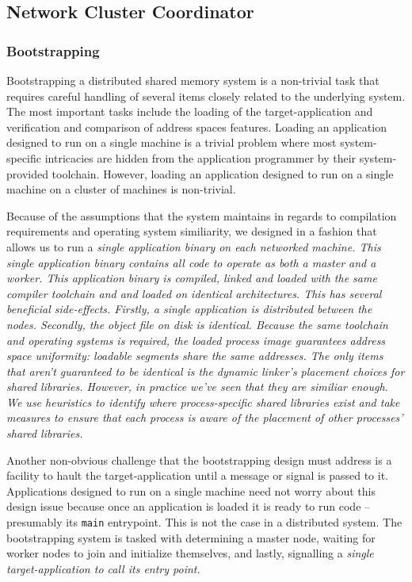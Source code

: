 \subsection{Network Cluster Coordinator}

\subsubsection{Bootstrapping}
Bootstrapping a distributed shared memory system is a non-trivial task that requires careful handling of several items closely related to the underlying system.  The most important tasks include the loading of the target-application and verification and comparison of address spaces features.  Loading an application designed to run on a single machine is a trivial problem where most system-specific intricacies are hidden from the application programmer by their system-provided toolchain.  However, loading an application designed to run on a single machine on a cluster of machines is non-trivial.

Because of the assumptions that the \projname{} system maintains in regards to compilation requirements and operating system similiarity, we designed \projname{} in a fashion that allows us to run a \em single \em application binary on each networked machine.  This \em single \em application binary contains all code to operate as both a master and a worker.  This application binary is compiled, linked and loaded with the same compiler toolchain and and loaded on identical architectures.  This has several beneficial side-effects.  Firstly, a single application is distributed between the nodes.  Secondly, the object file on disk is identical.  Because the same toolchain and operating systems is required, the loaded process image guarantees address space uniformity: loadable segments share the same addresses.  The only items that aren't guaranteed to be identical is the dynamic linker's placement choices for shared libraries.  However, in practice we've seen that they are similiar enough.  We use heuristics to identify where process-specific shared libraries exist and take measures to ensure that each process is aware of the placement of other processes' shared libraries.

Another non-obvious challenge that the bootstrapping design must address is a facility to hault the target-application until a message or signal is passed to it.  Applications designed to run on a single machine need not worry about this design issue because once an application is loaded it is ready to run code -- presumably its \verb,main, entrypoint.  This is not the case in a distributed system.  The \projname{} bootstrapping system is tasked with determining a master node, waiting for worker nodes to join and initialize themselves, and lastly, signalling a \em single \em target-application to call its entry point.

